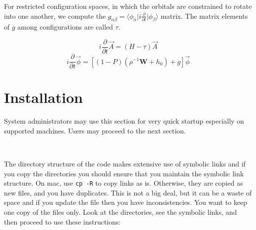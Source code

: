 \documentclass[10pt,leqno, oneside]{book}
\begin{document}
For restricted configuration spaces, in which the orbitals are constrained to rotate into one another, we compute the 
$g_{\alpha\beta}=\langle \phi_\alpha \vert i\frac{\partial}{\partial t} \vert \phi_\beta \rangle $ matrix.  The matrix elements of $g$
among configurations are called $\tau$.

\begin{equation} \nonumber
i\frac{\partial}{\partial t} \vec{A} = (H - \tau) \vec{A}
\end{equation}
\begin{equation} \nonumber
%
%
i\frac{\partial}{\partial t} \vec{\phi} = \left [ (1-P) \left( \rho^{-1} \mathbf{W} + h_0 \right) + g \right] \vec{\phi}
%
\end{equation}


\chapter{Installation\label{installchapter}}

System administrators may use this section for very quick startup especially on supported machines.  Users may proceed to the next section.

\

The directory structure of the code makes extensive use of symbolic links and if you copy the directories you should ensure that you maintain 
the symbolic link structure.  On mac, use \verb#cp -R# to copy links as is.  Otherwise, they are copied as new files, and you have duplicates.  
This is not a big deal, but it can be a waste of space and if you update the file then you have inconsistencies.  You want to keep one copy of the files only.
Look at the directories, see the symbolic links, and then proceed to use these instructions:

\
\end{document}
